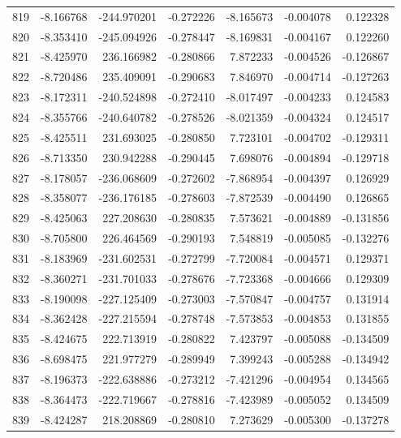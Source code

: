 \begin{tabular}{rrrrrrr}
 819 &  -8.166768 & -244.970201 & -0.272226 &  -8.165673 &  -0.004078 &  0.122328 \\
 820 &  -8.353410 & -245.094926 & -0.278447 &  -8.169831 &  -0.004167 &  0.122260 \\
 821 &  -8.425970 &  236.166982 & -0.280866 &   7.872233 &  -0.004526 & -0.126867 \\
 822 &  -8.720486 &  235.409091 & -0.290683 &   7.846970 &  -0.004714 & -0.127263 \\
 823 &  -8.172311 & -240.524898 & -0.272410 &  -8.017497 &  -0.004233 &  0.124583 \\
 824 &  -8.355766 & -240.640782 & -0.278526 &  -8.021359 &  -0.004324 &  0.124517 \\
 825 &  -8.425511 &  231.693025 & -0.280850 &   7.723101 &  -0.004702 & -0.129311 \\
 826 &  -8.713350 &  230.942288 & -0.290445 &   7.698076 &  -0.004894 & -0.129718 \\
 827 &  -8.178057 & -236.068609 & -0.272602 &  -7.868954 &  -0.004397 &  0.126929 \\
 828 &  -8.358077 & -236.176185 & -0.278603 &  -7.872539 &  -0.004490 &  0.126865 \\
 829 &  -8.425063 &  227.208630 & -0.280835 &   7.573621 &  -0.004889 & -0.131856 \\
 830 &  -8.705800 &  226.464569 & -0.290193 &   7.548819 &  -0.005085 & -0.132276 \\
 831 &  -8.183969 & -231.602531 & -0.272799 &  -7.720084 &  -0.004571 &  0.129371 \\
 832 &  -8.360271 & -231.701033 & -0.278676 &  -7.723368 &  -0.004666 &  0.129309 \\
 833 &  -8.190098 & -227.125409 & -0.273003 &  -7.570847 &  -0.004757 &  0.131914 \\
 834 &  -8.362428 & -227.215594 & -0.278748 &  -7.573853 &  -0.004853 &  0.131855 \\
 835 &  -8.424675 &  222.713919 & -0.280822 &   7.423797 &  -0.005088 & -0.134509 \\
 836 &  -8.698475 &  221.977279 & -0.289949 &   7.399243 &  -0.005288 & -0.134942 \\
 837 &  -8.196373 & -222.638886 & -0.273212 &  -7.421296 &  -0.004954 &  0.134565 \\
 838 &  -8.364473 & -222.719667 & -0.278816 &  -7.423989 &  -0.005052 &  0.134509 \\
 839 &  -8.424287 &  218.208869 & -0.280810 &   7.273629 &  -0.005300 & -0.137278 \\

\end{tabular}

